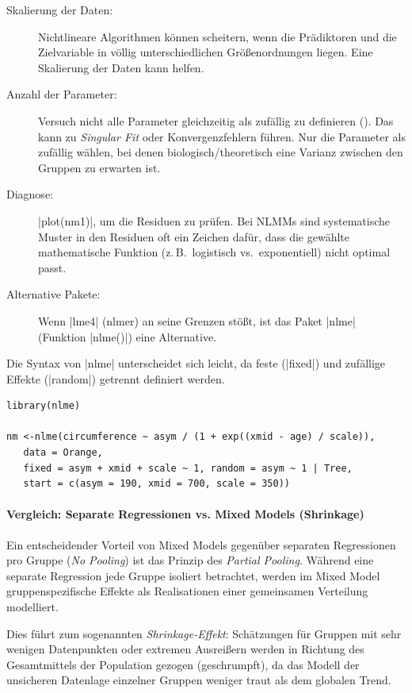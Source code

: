 \documentclass[10pt,twocolumn]{scrartcl}
\renewcommand{\lstinline}{\mycoloredinline}
\begin{document}
\begin{description}
\item[Skalierung der Daten:] Nichtlineare Algorithmen können scheitern, wenn die Prädiktoren und die Zielvariable in völlig unterschiedlichen Größenordnungen liegen. Eine Skalierung der Daten kann helfen.
\item[Anzahl der Parameter:] Versuch nicht alle Parameter gleichzeitig als zufällig zu definieren (\lstinline{(asym + xmid + scale | Tree)}). Das kann zu \textit{Singular Fit} oder Konvergenzfehlern führen. Nur die Parameter als zufällig wählen, bei denen biologisch/theoretisch eine Varianz zwischen den Gruppen zu erwarten ist.
\item[Diagnose:] \lstinline|plot(nm1)|, um die Residuen zu prüfen. Bei NLMMs sind systematische Muster in den Residuen oft ein Zeichen dafür, dass die gewählte mathematische Funktion (z.\,B.\ logistisch vs.\ exponentiell) nicht optimal passt.
\item[Alternative Pakete:] Wenn \lstinline|lme4| (nlmer) an seine Grenzen stößt, ist das Paket \lstinline|nlme| (Funktion \lstinline|nlme()|) eine Alternative.
\end{description}

Die Syntax von \lstinline|nlme| unterscheidet sich leicht, da feste (\lstinline|fixed|) und zufällige Effekte (\lstinline|random|) getrennt definiert werden.

\begin{lstlisting}
library(nlme)

nm <-nlme(circumference ~ asym / (1 + exp((xmid - age) / scale)),
   data = Orange,
   fixed = asym + xmid + scale ~ 1, random = asym ~ 1 | Tree,
   start = c(asym = 190, xmid = 700, scale = 350))
\end{lstlisting}


\paragraph{Vergleich: Separate Regressionen vs. Mixed Models (Shrinkage)}

Ein entscheidender Vorteil von Mixed Models gegenüber separaten Regressionen pro Gruppe (\emph{No Pooling}) ist das Prinzip des \emph{Partial Pooling}. Während eine separate Regression jede Gruppe isoliert betrachtet, werden im Mixed Model gruppenspezifische Effekte als Realisationen einer gemeinsamen Verteilung modelliert.

Dies führt zum sogenannten \emph{Shrinkage-Effekt}: Schätzungen für Gruppen mit sehr wenigen Datenpunkten oder extremen Ausreißern werden in Richtung des Gesamtmittels der Population gezogen (geschrumpft), da das Modell der unsicheren Datenlage einzelner Gruppen weniger traut als dem globalen Trend.
\end{document}
